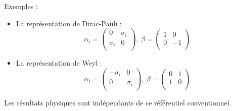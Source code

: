 Exemples :
\begin{itemize}[leftmargin=1cm,  itemsep=1pt]
\item La représentation de Dirac-Pauli : \[\alpha_i=\left(\begin{array}{cc}
0&\sigma_i\\\sigma_i&0\\\end{array}\right),\ \beta=\left(\begin{array}{cc}
1&0\\0&-1\\\end{array}\right)\]
\item La représentation de Weyl : \[\alpha_i=\left(\begin{array}{cc}
-\sigma_i&0\\0&\sigma_i\\\end{array}\right),\ \beta=\left(\begin{array}{cc}
0&1\\1&0\\\end{array}\right)\]
\end{itemize}
Les résultats physiques sont indépendants de ce référentiel conventionnel.
